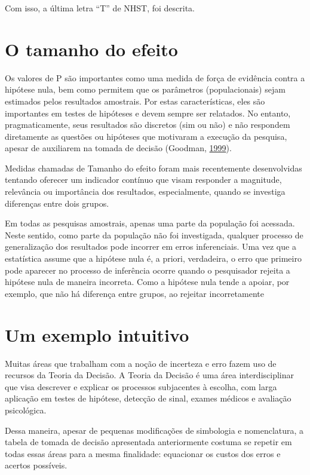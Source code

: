 \documentclass[
]{book}
\begin{document}
Com isso, a última letra ``T'' de NHST, foi descrita.

\hypertarget{o-tamanho-do-efeito}{%
\section{O tamanho do efeito}\label{o-tamanho-do-efeito}}

Os valores de P são importantes como uma medida de força de evidência
contra a hipótese nula, bem como permitem que os parâmetros
(populacionais) sejam estimados pelos resultados amostrais. Por estas
características, eles são importantes em testes de hipóteses e devem
sempre ser relatados. No entanto, pragmaticamente, seus resultados são
discretos (sim ou não) e não respondem diretamente as questões ou
hipóteses que motivaram a execução da pesquisa, apesar de auxiliarem na
tomada de decisão (Goodman, \protect\hyperlink{ref-Goodman1999}{1999}).

Medidas chamadas de Tamanho do efeito foram mais recentemente
desenvolvidas tentando oferecer um indicador contínuo que visam
responder a magnitude, relevância ou importância dos resultados,
especialmente, quando se investiga diferenças entre dois grupos.

Em todas as pesquisas amostrais, apenas uma parte da população foi
acessada. Neste sentido, como parte da população não foi investigada,
qualquer processo de generalização dos resultados pode incorrer em erros
inferenciais. Uma vez que a estatística assume que a hipótese nula é, a
priori, verdadeira, o erro que primeiro pode aparecer no processo de
inferência ocorre quando o pesquisador rejeita a hipótese nula de
maneira incorreta. Como a hipótese nula tende a apoiar, por exemplo, que
não há diferença entre grupos, ao rejeitar incorretamente

\hypertarget{um-exemplo-intuitivo}{%
\section{Um exemplo intuitivo}\label{um-exemplo-intuitivo}}

Muitas áreas que trabalham com a noção de incerteza e erro fazem uso de
recursos da Teoria da Decisão. A Teoria da Decisão é uma área
interdisciplinar que visa descrever e explicar os processos subjacentes
à escolha, com larga aplicação em testes de hipótese, detecção de sinal,
exames médicos e avaliação psicológica.

Dessa maneira, apesar de pequenas modificações de simbologia e
nomenclatura, a tabela de tomada de decisão apresentada anteriormente
costuma se repetir em todas essas áreas para a mesma finalidade:
equacionar os custos dos erros e acertos possíveis.
\end{document}
